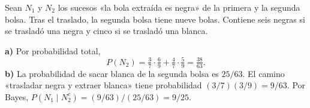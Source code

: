 Sean $N_1$ y $N_2$ los sucesos «la bola extraída es negra» de la primera y la segunda bolsa. Tras el traslado, la segunda bolsa tiene nueve bolas. Contiene seis negras si se trasladó una negra y cinco si se trasladó una blanca.

\textbf{a)} Por probabilidad total,
\[
P(N_2)=\tfrac37\cdot\tfrac69+\tfrac47\cdot\tfrac59=\boxed{\tfrac{38}{63}}.
\]
\textbf{b)} La probabilidad de sacar blanca de la segunda bolsa es $25/63$. El camino «trasladar negra y extraer blanca» tiene probabilidad $(3/7)(3/9)=9/63$. Por Bayes, $P(N_1\mid N_2^c)=(9/63)/(25/63)=\boxed{9/25}$.
